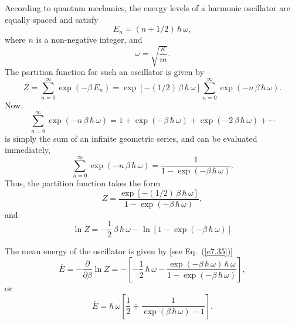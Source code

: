 According to quantum mechanics, the energy levels of a harmonic oscillator are equally
spaced and satisfy 
\begin{equation}
E_n = (n + 1/2) \,\hbar \,\omega,\label{e7.110}
\end{equation}
where $n$ is a non-negative integer, and
\begin{equation}
\omega = \sqrt{\frac{\kappa}{m}}.\label{e7.111}
\end{equation}
The partition function for such an oscillator is given by 
\begin{equation}
Z  = \sum_{n=0}^\infty \exp(-\beta \,E_n) = \exp[-(1/2)\,\beta \,\hbar \,\omega]
\sum_{n=0}^\infty \exp(- n\,\beta\, \hbar\,\omega).
\end{equation}
Now,
\begin{equation}
\sum_{n=0}^\infty \exp(- n\,\beta\, \hbar \,\omega) = 1 + \exp(-\beta\,\hbar\,\omega)
+ \exp(-2\,\beta\,\hbar\,\omega) + \cdots
\end{equation}
is simply the sum of an infinite geometric series, and can be evaluated immediately,
\begin{equation}
\sum_{n=0}^\infty \exp(- n\,\beta\, \hbar\, \omega) = \frac{1}{1-\exp(-\beta\,\hbar
\,\omega)}.
\end{equation}
Thus, the partition function takes the form
\begin{equation}
Z = \frac{ \exp[-(1/2)\,\beta\,\hbar\,\omega]}{1-\exp(-\beta\,\hbar\,\omega)},
\end{equation}
and
\begin{equation}
\ln Z = - \frac{1}{2}\,\beta\,\hbar\,\omega -\ln [1- \exp(-\beta\,\hbar\,\omega)]
\end{equation}

The mean energy of the oscillator is given by [see Eq.~(\ref{e7.35})]
\begin{equation}
\overline{E} = - \frac{\partial}{\partial \beta} \ln Z = -
\left[-\frac{1}{2}\,\hbar \,\omega - \frac{\exp(-\beta\,\hbar\,\omega)\,\hbar\,\omega}
{1-\exp(-\beta\,\hbar\,\omega)}\right],
\end{equation}
or
\begin{equation}
\overline{E} = \hbar \,\omega \left[ \frac{1}{2} + \frac{1}{\exp(\beta\, \hbar\,
\omega)-1}
\right].\label{e7.118}
\end{equation}

